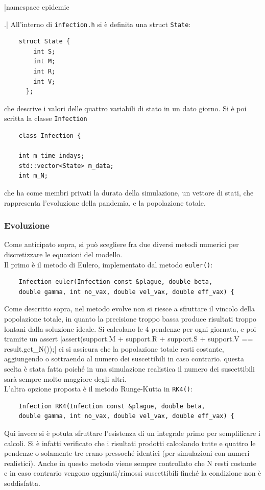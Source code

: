 \documentclass{article}
\begin{document}
|namespace epidemic{.|
All'interno di \verb|infection.h| si è definita una struct 
\verb|State|: 
\begin{verbatim}
    struct State {
        int S; 
        int M; 
        int R; 
        int V; 
      };
\end{verbatim}
che descrive i valori delle quattro variabili di stato in un dato giorno.
Si è poi scritta la classe \verb|Infection|
\begin{verbatim}
    class Infection {

    int m_time_indays; 
    std::vector<State> m_data; 
    int m_N; 
\end{verbatim}    
che ha come membri privati la durata della simulazione, un vettore di 
stati, che rappresenta l'evoluzione della pandemia, e la popolazione 
totale.
\subsubsection{Evoluzione}
Come anticipato sopra, si può scegliere fra due diversi metodi 
numerici per discretizzare le equazioni del modello.\\
Il primo è il metodo di Eulero, implementato dal metodo 
\verb|euler()|:
\begin{verbatim}
    Infection euler(Infection const &plague, double beta, 
    double gamma, int no_vax, double vel_vax, double eff_vax) {
\end{verbatim}
Come descritto sopra, nel metodo evolve non si riesce a sfruttare
il vincolo della popolazione totale, in quanto la precisione troppo
bassa produce risultati troppo lontani dalla soluzione ideale.
Si calcolano le 4 pendenze per ogni giornata, e poi tramite un 
assert
|assert(support.M + support.R + support.S + support.V == result.get_N());|
ci si assicura che la popolazione totale resti costante, aggiungendo
o sottraendo al numero dei suscettibili in caso contrario.
questa scelta è stata fatta poiché in una simulazione realistica
il numero dei suscettibili sarà sempre molto maggiore degli altri.\\
L'altra opzione proposta è il metodo Runge-Kutta in \verb|RK4()|:
\begin{verbatim}
    Infection RK4(Infection const &plague, double beta, 
    double gamma, int no_vax, double vel_vax, double eff_vax) {
\end{verbatim}
Qui invece si è potuta sfruttare l'esistenza di un integrale primo
per semplificare i calcoli. Si è infatti verificato che i risultati 
prodotti calcolando tutte e quattro le pendenze o solamente tre erano
pressoché identici (per simulazioni con numeri realistici).
Anche in questo metodo viene sempre controllato che N resti 
costante e in caso contrario vengono aggiunti/rimossi suscettibili 
finché la condizione non è soddisfatta.
}
\end{document}
